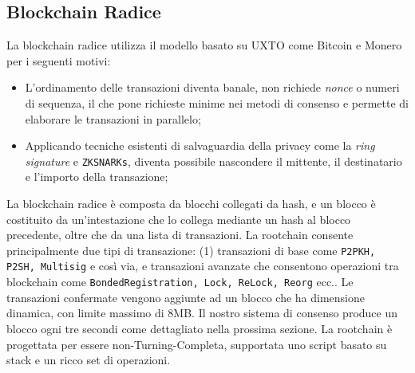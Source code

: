 \subsection{Blockchain Radice}
La blockchain radice utilizza il modello basato su UXTO come Bitcoin \cite{c21} e Monero \cite{c20} per i seguenti motivi:

\begin{itemize}
	\item
	      L'ordinamento delle transazioni diventa banale, non richiede \emph{nonce} o numeri di sequenza, il che pone richieste minime nei metodi di consenso e permette di elaborare le transazioni in parallelo;
	\item
	      Applicando tecniche esistenti di salvaguardia della privacy come la \emph{ring signature} e \texttt{ZKSNARKs}, diventa possibile nascondere il mittente, il destinatario e l'importo della transazione;
\end{itemize}

La blockchain radice è composta da blocchi collegati da hash, e un blocco è costituito da  un'intestazione che lo collega mediante un hash al blocco precedente, oltre che da una lista di transazioni. La rootchain consente principalmente due tipi di transazione: (1) transazioni di base come \texttt{P2PKH, P2SH, Multisig} e così via, e transazioni avanzate che consentono operazioni tra blockchain come \texttt{BondedRegistration, Lock, ReLock, Reorg} ecc.. Le transazioni confermate vengono aggiunte ad un blocco che ha dimensione dinamica, con limite massimo di 8MB. Il nostro sistema di consenso produce un blocco ogni tre secondi come dettagliato nella prossima sezione. La rootchain è progettata per essere non-Turning-Completa, supportata uno script basato su stack e un ricco set di operazioni.

